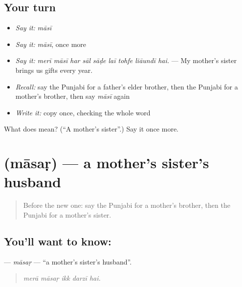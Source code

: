 \subsection*{Your turn}
\begin{itemize}
\raggedright
  \item \emph{Say it:} \emph{māsī}
  \item \emph{Say it:} \emph{māsī}, once more
  \item \emph{Say it:} \emph{merī māsī har sāl sāḍe laī tohfe liāundī hai.} — My mother's sister brings us gifts every year.
  \item \emph{Recall:} say the Punjabi for a father's elder brother, then the Punjabi for a mother's brother, then say \emph{māsī} again
  \item \emph{Write it:} copy \textbf{} once, checking the whole word
\end{itemize}

\begin{tcolorbox}[breakable,colback=teal!4,colframe=teal!35!black,title={Before you move on}]
What does  mean? (\textquotedblleft{}A mother's sister\textquotedblright{}.) Say it once more.
\end{tcolorbox}
\section[\texorpdfstring{\pa{ਮਾਸੜ} (māsaṛ)}{ਮਾਸੜ (māsaṛ)}]{ (māsaṛ) — a mother's sister's husband}

\label{lesson:PA-C331-masar}



\begin{quote}
Before the new one: say the Punjabi for a mother's brother, then the Punjabi for a mother's sister.
\end{quote}

\subsection*{You'll want to know: }
\textbf{} — \emph{māsaṛ} — \textquotedblleft{}a mother's sister's husband\textquotedblright{}.

\begin{quote}
    
\end{quote}

\begin{quote}
\emph{merā māsaṛ ikk darzī hai.}
\end{quote}

